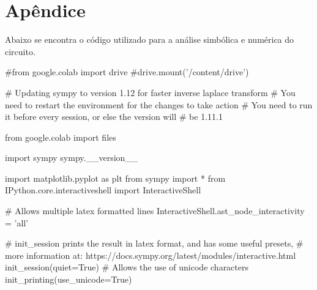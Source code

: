 \section{Apêndice}

Abaixo se encontra o código utilizado para a análise simbólica e numérica do circuito.

\begin{python}
    #from google.colab import drive
    #drive.mount('/content/drive')

    # Updating sympy to version 1.12 for faster inverse laplace transform
    # You need to restart the environment for the changes to take action
    # You need to run it before every session, or else the version will
    # be 1.11.1

    from google.colab import files


    import sympy
    sympy.__version__

    import matplotlib.pyplot as plt
    from sympy import *
    from IPython.core.interactiveshell import InteractiveShell

    # Allows multiple latex formatted lines
    InteractiveShell.ast_node_interactivity = 'all'

    # init_session prints the result in latex format, and has some useful presets,
    # more information at: https://docs.sympy.org/latest/modules/interactive.html
    init_session(quiet=True)
    # Allows the use of unicode characters
    init_printing(use_unicode=True)

\end{python}

